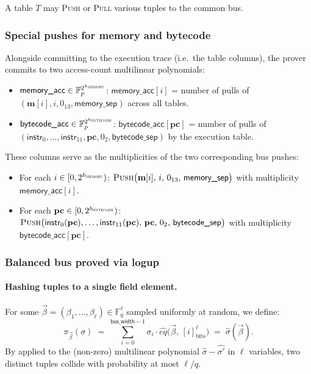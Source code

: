 \documentclass{article}
\theoremstyle{definition}
\newcommand{\Fp}{\mathbb F_p}
\newcommand{\Fq}{\mathbb F_q}
\begin{document}
A table $T$ may \textsc{Push} or \textsc{Pull} various tuples to the common bus.

\subsubsection{Special pushes for memory and bytecode}\label{sec:special-pushes}

Alongside committing to the execution trace (i.e.\ the table columns), the prover commits to two access-count multilinear polynomials:
\begin{itemize}
    \item $\textsf{memory\_acc} \in \Fp^{2^{h_\textsc{memory}}}$: $\textsf{memory\_acc}[i]$ = number of pulls of $(\textbf{m}[i], i, 0_{13}, \textsf{memory\_sep})$ across all tables.
    \item $\textsf{bytecode\_acc} \in \Fp^{2^{h_\textsc{bytecode}}}$: $\textsf{bytecode\_acc}[\textbf{pc}]$ = number of pulls of $(\textsf{instr}_0, \dots, \textsf{instr}_{11}, \textbf{pc}, 0_2, \textsf{bytecode\_sep})$ by the execution table.
\end{itemize}
These columns serve as the multiplicities of the two corresponding bus pushes:
\begin{itemize}
    \item For each $i \in [0, 2^{h_\textsc{memory}})$: $\textsc{Push}\big(\textbf{m}[i],\, i,\, 0_{13},\, \textsf{memory\_sep}\big)$ with multiplicity $\textsf{memory\_acc}[i]$.
    \item For each $\textbf{pc} \in [0, 2^{h_\textsc{bytecode}})$: $\textsc{Push}\big(\textsf{instr}_0(\textbf{pc}), \dots, \textsf{instr}_{11}(\textbf{pc}),\, \textbf{pc},\, 0_2,\, \textsf{bytecode\_sep}\big)$ with multiplicity $\textsf{bytecode\_acc}[\textbf{pc}]$.
\end{itemize}

\subsubsection{Balanced bus proved via logup}

\paragraph{Hashing tuples to a single field element.} For some $\vec\beta = (\beta_1, \ldots, \beta_\ell) \in \Fq^\ell$ sampled uniformly at random, we define:
\[
\pi_{\vec\beta}(\sigma) \;=\; \sum_{i=0}^{\textsf{bus\_width} - 1} \sigma_i \cdot \hat{eq}\big(\vec\beta,\, [i]_\text{bits}^\ell\big) \;=\; \hat{\sigma}(\vec\beta).
\]
By  applied to the (non-zero) multilinear polynomial $\hat\sigma - \hat{\sigma'}$ in $\ell$ variables, two distinct tuples collide with probability at most $\ell/q$.
\end{document}
